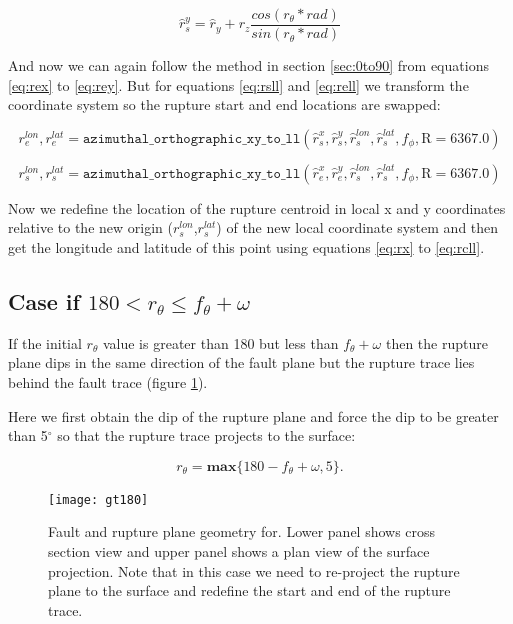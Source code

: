 \begin{equation}
\hat{r}_s^{y} = \hat{r}_y + r_z  \frac{cos(r_\theta * rad)}{sin(r_\theta * rad)}
\end{equation}

And now we can again follow the method in section \ref{sec:0to90} from equations \ref{eq:rex} to \ref{eq:rey}. 
But for equations \ref{eq:rsll} and \ref{eq:rell} we transform the coordinate system so the rupture start and end locations are swapped:

\begin{equation}\label{eq:rsll2}
r_e^{lon}, r_e^{lat } = \mathtt{azimuthal\_orthographic\_xy\_to\_ll}(\hat{r}_s^{x}, \hat{r}_s^{y}, \hat{r}_s^{lon},\hat{r}_s^{lat},f_\phi,\mbox{R}=6367.0)
\end{equation}

\begin{equation}\label{eq:rell2}
r_s^{lon}, r_s^{lat} = \mathtt{azimuthal\_orthographic\_xy\_to\_ll}(\hat{r}_e^{x}, \hat{r}_e^{y}, \hat{r}_s^{lon},\hat{r}_s^{lat},f_\phi,\mbox{R}=6367.0)
\end{equation}

Now we redefine the location of the rupture centroid in local x and y coordinates relative to the new 
origin ($r_s^{lon}$,$ r_s^{lat}$) of the new local coordinate system and then get the longitude and 
latitude of this point using equations \ref{eq:rx} to \ref{eq:rcll}.

\subsection{Case if  $180 <  r_\theta \leq f_\theta + \omega$} \label{sec:180to270}

If the initial $r_\theta$ value is greater than 180 but less than $f_\theta + \omega$ then the rupture 
plane dips in the same direction of the fault plane but the rupture trace lies behind the fault trace (figure \ref{fig:gt180}). 

Here we first obtain the dip of the rupture plane and force the dip to be greater than 5$^\circ$ so 
that the rupture trace projects to the surface:

\begin{equation}
r_\theta = \mathbf{max} \{ 180 - f_\theta + \omega, 5 \} .
\end{equation}

\begin{figure}[htp]
\centerline{\texttt{[image: gt180]}}
\caption{Fault and rupture plane geometry for. Lower panel shows cross section view and upper panel shows 
a plan view of the surface projection. Note that in this case we need to re-project the rupture plane to 
the surface and redefine the start and end of the rupture trace.}
\label{fig:gt180}
\end{figure}


